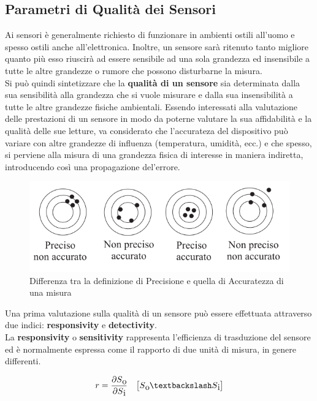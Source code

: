 \subsection{Parametri di Qualità dei Sensori}
\label{subsec:quality_param}
Ai sensori è generalmente richiesto di funzionare in ambienti ostili all'uomo e spesso ostili anche all'elettronica. Inoltre, un sensore sarà ritenuto tanto migliore quanto più esso riuscirà ad essere sensibile ad una sola grandezza ed insensibile a tutte le altre grandezze o rumore che possono disturbarne la misura. \cite{book:slide_Attivissimo} \cite{book:sensori_trasduttori} \\
Si può quindi sintetizzare che la \textbf{qualità di un sensore} sia determinata dalla sua sensibilità alla grandezza che si vuole misurare e dalla sua insensibilità a tutte le altre grandezze fisiche ambientali.
Essendo interessati alla valutazione delle prestazioni di un sensore in modo da poterne valutare la sua affidabilità e la qualità delle sue letture, va considerato che l'accurateza del dispositivo può variare con altre grandezze di influenza (temperatura, umidità, ecc.) e che spesso, si perviene alla misura di una grandezza fisica di interesse in maniera indiretta, introducendo così una propagazione del'errore.
\begin{figure}
	\begin{center}
		\includegraphics[width=0.9\columnwidth]{images/accuracy_precision}
	\end{center}
	\caption{Differenza tra la definizione di Precisione e quella di Accuratezza di una misura}
	\label{fig:accuracy_precision}
\end{figure}
Una prima valutazione sulla qualità di un sensore può essere effettuata attraverso due indici: \textbf{responsivity} e \textbf{detectivity}.\\
La \textbf{responsivity} o \textbf{sensitivity} rappresenta l'efficienza di trasduzione del sensore ed è normalmente espressa come il rapporto di due unità di misura, in genere differenti.
\begin{center}
	\begin{equation}
		r = \frac{\partial S\textsubscript{o}}{\partial S\textsubscript{i}} \quad \big[S\textsubscript{o} \textbackslash S\textsubscript{i}\big]
	\end{equation}
\end{center}

